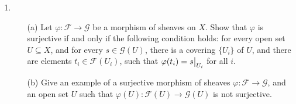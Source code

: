 \documentclass{article}
\begin{document}
\begin{enumerate} [label=\textbf{\arabic*.}, leftmargin=0em]
\begin{proof} $ $ \vspace{0pt}
    \begin{itemize} [leftmargin=0cm]
        \item[(a)] It is true in general that kernels commute with limits and cokernels commmute with colimits in any abelian category, since kernels and cokernels can be realized as limits and colimits, respectively.

        \item[(b)] $\varphi$ is injective $\iff$ $\ker{\varphi} = 0$ $\iff$ $(\ker{\varphi})_P = 0$ $\iff$ $\ker{\varphi_P} = 0$.
        
        $\varphi$ is surjective $\iff$ $\im{\varphi} = \fG$ $\iff$ $\im(\varphi_P) = (\im{\varphi})_P = \fG_P$.

        \item[(c)] The sequence $\dots \to \mathscr{F}^{i - 1} \xrightarrow{\varphi^{i - 1}} \mathscr{F}^i \xrightarrow{\varphi^i} \mathscr{F}^{i + 1} \to \dots$ is exact $\iff$ $\im{\varphi^{i - 1}} = \ker{\varphi^i}$ for all $i$ $\iff$ $(\im{\varphi^{i - 1}})_P = (\ker{\varphi^i})_P$ for all $i$ and $P \in X$ $\iff$ $\im(\varphi^{i - 1}_P) = \ker(\varphi^i_P)$ for all $i$ and $P \in X$ by part (a) above.
    \end{itemize}
\end{proof}

\item \begin{itemize}
    \item[(a)] Let $\varphi : \mathscr{F} \to \mathscr{G}$ be a morphism of sheaves on $X$. Show that $\varphi$ is surjective if and only if the following condition holds: for every open set $U \subseteq X$, and for every $s \in \mathscr{G}(U)$, there is a covering $\{ U_i \}$ of $U$, and there are elements $t_i \in \mathscr{F}(U_i)$, such that $\varphi(t_i) = \restr{s}{U_i}$ for all $i$.
    \item[(b)] Give an example of a surjective morphism of sheaves $\varphi : \mathscr{F} \to \mathscr{G}$, and an open set $U$ such that $\varphi(U) : \mathscr{F}(U) \to \mathscr{G}(U)$ is not surjective.
\end{itemize}


\end{enumerate}
\end{document}
